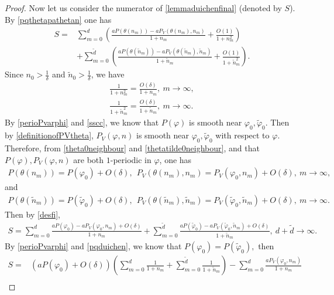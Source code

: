 \documentclass[12pt]{amsart}
\theoremstyle{plain}
\theoremstyle{definition}
\begin{document}
\begin{proof}
		Now let us consider the numerator of \eqref{lemmaduichenfinal} (denoted by $S$).
		By \eqref{pqthetapathetan} one has
		\begin{align}
			S=&\sum_{m=0}^{d}\left(\frac{aP(\theta(n_{m}))-aP_V(\theta(n_{m}),n_{m})}{1+n_{m}}+\frac{O(1)}{1+n_{m}^2}\right)\label{desfi}\\
			&+\sum_{m=0}^{\tilde{d}}\left(\frac{aP(\theta(\tilde{n}_{m}))-aP_V(\theta(\tilde{n}_{m}),\tilde{n}_{m})}{1+\tilde{n}_{m}}+\frac{O(1)}{1+\tilde{n}_{m}^2}\right).\nonumber
		\end{align}
		Since $n_0>\frac{1}{\delta}$ and $\tilde{n}_0>\frac{1}{\delta}$, we have
		\begin{align}
		\label{nmsquaredOvarepsilon}	\frac{1}{1+n_m^2}=\frac{O(\delta)}{1+n_m},\ m\to\infty,\\
		\label{nmtildesquaredOvarepsilon}	\frac{1}{1+\tilde{n}_m^2}=\frac{O(\delta)}{1+\tilde{n}_m},\ m\to\infty.
		\end{align}
	By \eqref{perioPvarphi} and \eqref{sscc}, we know that $P(\varphi)$ is smooth near $\varphi_0,\tilde{\varphi}_0$. Then by \eqref{definitionofPVtheta}, $P_V(\varphi,n)$ is smooth near $\varphi_0,\tilde{\varphi}_0$  with respect to $\varphi$. Therefore, from
	\eqref{theta0neighbour} and \eqref{thetatilde0neighbour}, and that $P(\varphi),P_V(\varphi,n)$ are both $1$-periodic in $\varphi$, one has
\begin{align}
	P(\theta(n_m))=P(\varphi_0)+O(\delta),\ \  P_V(\theta(n_m),n_m)=P_V(\varphi_0,n_m)+O(\delta),\ m\to\infty,\nonumber
\end{align}
and
\begin{align}
	P(\theta(\tilde{n}_m))=P(\tilde{\varphi}_0)+O(\delta),\ \  P_V(\theta(\tilde{n}_m),\tilde{n}_m)=P_V(\tilde{\varphi}_0,\tilde{n}_m)+O(\delta),\ m\to\infty. \nonumber
\end{align}		
Then by \eqref{desfi},
		\begin{align}
			S=\sum_{m=0}^{d}\frac{aP(\varphi_0)-aP_V(\varphi_0,n_{m})+O(\delta)}{1+n_{m}}+\sum_{m=0}^{\tilde{d}}\frac{aP(\tilde{\varphi}_0)-aP_V(\tilde{\varphi}_0,\tilde{n}_{m})+O(\delta)}{1+\tilde{n}_{m}},\ d+\tilde{d}\to\infty.\nonumber
		\end{align}
		By \eqref{perioPvarphi} and \eqref{pqduichen}, we know that $P(\varphi_0)=P(\tilde{\varphi}_0),$ then
		\begin{align}
			S=&\left(aP(\varphi_0)+O(\delta)\right)\left(\sum_{m=0}^{d}\frac{1}{1+n_{m}}+\sum_{m=0}^{\tilde{d}}\frac{1}{1+\tilde{n}_{m}}\right)-\sum_{m=0}^{d}\frac{aP_V(\varphi_0,n_{m})}{1+n_{m}}\label{l3.5numerator}\\

\end{align}
\end{proof}
\end{document}
